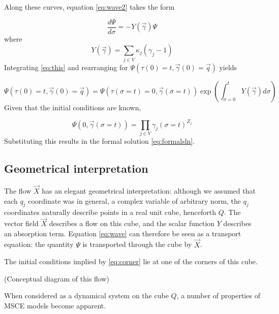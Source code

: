 \documentclass{article}
\begin{document}
Along these curves, equation
\eqref{eq:wave2} takes the form

\begin{equation}
    \frac{d \Psi}{d \sigma} = -Y(\vec{\gamma}) \Psi
    \label{eq:this}
\end{equation}
where
\begin{equation}
    Y(\vec{\gamma}) = \sum_{j \in V}\kappa_j (\gamma_j - 1)
\end{equation}
Integrating \eqref{eq:this} and rearranging for $\Psi(\tau(0) = t, \vec{\gamma}(0) =
\vec{q})$ yields

\begin{equation}
    \Psi(\tau(0) = t, \vec{\gamma}(0) = \vec{q})
    = \Psi(\tau(\sigma = t) = 0, \vec{\gamma}(\sigma = t))
    \exp\left(\int_{\sigma=0}^t Y(\vec{\gamma}) d\sigma\right)
\end{equation}
Given that the initial conditions are known,

\begin{equation}
    \Psi(0, \vec{\gamma}(\sigma=t)) = \prod_{j \in V} \gamma_j(\sigma=t)^{Z_j}
\end{equation}
Substituting this results in the formal solution \eqref{eq:formalsln}.


\subsection{Geometrical interpretation}

The flow $\vec{X}$ has an elegant geometrical interpretation: although we
assumed that each $q_j$ coordinate was in general, a complex variable of
arbitrary norm, the $q_j$ coordinates naturally describe points in a real unit
cube, henceforth $Q$. The vector field $\vec{X}$ describes a flow on this cube, and the
scalar function $Y$ describes an absorption term. Equation \eqref{eq:wave} can
therefore be seen as a transport equation: the quantity $\Psi$ is transported
through the cube by $\vec{X}$.

The initial conditions implied by \eqref{eq:corner} lie at one of the corners of
this cube.

(Conceptual diagram of this flow)

When considered as a dynamical system on the cube $Q$, a number of properties
of MSCE models become apparent.
\end{document}
